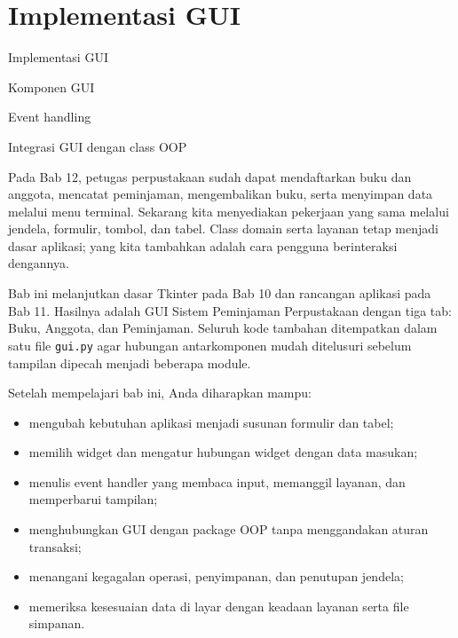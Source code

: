 \chapter{Implementasi GUI}

\begingroup
\ifPDFTeX\else
\fi

\begin{dibabini}
  \item Implementasi GUI
  \item Komponen GUI
  \item Event handling
  \item Integrasi GUI dengan class OOP
\end{dibabini}

Pada Bab 12, petugas perpustakaan sudah dapat mendaftarkan buku dan anggota, mencatat peminjaman, mengembalikan buku, serta menyimpan data melalui menu terminal. Sekarang kita menyediakan pekerjaan yang sama melalui jendela, formulir, tombol, dan tabel. Class domain serta layanan tetap menjadi dasar aplikasi; yang kita tambahkan adalah cara pengguna berinteraksi dengannya.

Bab ini melanjutkan dasar Tkinter pada Bab 10 dan rancangan aplikasi pada Bab 11. Hasilnya adalah GUI Sistem Peminjaman Perpustakaan dengan tiga tab: Buku, Anggota, dan Peminjaman. Seluruh kode tambahan ditempatkan dalam satu file \texttt{gui.py} agar hubungan antarkomponen mudah ditelusuri sebelum tampilan dipecah menjadi beberapa module.

\begin{info}
Setelah mempelajari bab ini, Anda diharapkan mampu:
\begin{itemize}
  \item mengubah kebutuhan aplikasi menjadi susunan formulir dan tabel;
  \item memilih widget dan mengatur hubungan widget dengan data masukan;
  \item menulis event handler yang membaca input, memanggil layanan, dan memperbarui tampilan;
  \item menghubungkan GUI dengan package OOP tanpa menggandakan aturan transaksi;
  \item menangani kegagalan operasi, penyimpanan, dan penutupan jendela;
  \item memeriksa kesesuaian data di layar dengan keadaan layanan serta file simpanan.
\end{itemize}
\end{info}

